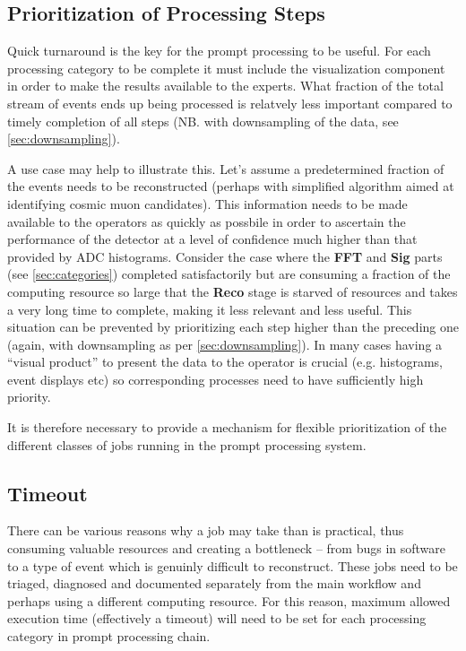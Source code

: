 \documentclass[pdftex,12pt,letter]{article}
\begin{document}
\subsection{Prioritization of Processing Steps}
\label{sec:priority}
Quick turnaround is the key for the prompt processing to be useful. For each processing category
to be complete it must include the visualization component in order to make the results available
to the experts. What fraction of the total stream of events ends up being processed is relatvely less
important compared to timely completion of all steps (NB. with downsampling of the data, see 
\ref{sec:downsampling}).

A use case may help to illustrate this. Let's assume a predetermined fraction of the events needs to
be reconstructed (perhaps with simplified algorithm aimed at identifying cosmic muon candidates).
This information needs to be made available to the operators as quickly as possbile in order to ascertain the performance
of the detector at a level of confidence much higher than that provided by ADC histograms.
Consider the case where the \textbf{FFT} and \textbf{Sig} parts (see \ref{sec:categories})
completed satisfactorily but are consuming a fraction of the computing resource so large that
the  \textbf{Reco} stage is starved of resources and takes a very long time to complete, making
it less relevant and less useful. This situation can be prevented by prioritizing each step higher
than the preceding one (again, with downsampling as per \ref{sec:downsampling}). In many
cases having a ``visual product'' to present the data to the operator is crucial (e.g. histograms,
event displays etc) so corresponding processes need to have sufficiently high priority.

It is therefore necessary to provide a mechanism for flexible prioritization of the different
classes of jobs running in the prompt processing system.

\subsection{Timeout}
There can be various reasons why a job may take than is practical, thus consuming valuable resources
and creating a bottleneck -- from bugs in software to a type of event which is genuinly difficult to reconstruct.
These jobs need to be triaged, diagnosed and documented separately from the main workflow and perhaps
using a different computing resource. For this reason, maximum allowed execution time (effectively a timeout)
will need to be set for each processing category in prompt processing chain.
\end{document}
